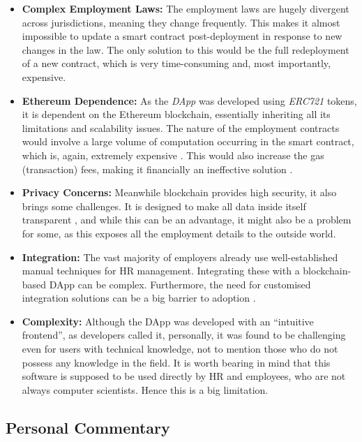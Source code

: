 \begin{itemize}
    \item \textbf{Complex Employment Laws:}
    The employment laws are hugely divergent across jurisdictions, meaning they change frequently. This makes it almost impossible to update a smart contract post-deployment \cite{MagazzeniEtAl2017} in response to new changes in the law. The only solution to this would be the full redeployment of a new contract, which is very time-consuming and, most importantly, expensive.
    \item \textbf{Ethereum Dependence:} 
    As the \textit{DApp} was developed using \textit{ERC721} tokens, it is dependent on the Ethereum blockchain, essentially inheriting all its limitations and scalability issues. The nature of the employment contracts would involve a large volume of computation occurring in the smart contract, which is, again, extremely expensive \cite{Buterin2014}. This would also increase the gas (transaction) fees, making it financially an ineffective solution \cite{Buterin2014}.
    \item \textbf{Privacy Concerns:} Meanwhile blockchain provides high security, it also brings some challenges. It is designed to make all data inside itself transparent \cite{Mik2017}, and while this can be an advantage, it might also be a problem for some, as this exposes all the employment details to the outside world. 
    \item \textbf{Integration:} The vast majority of employers already use well-established manual techniques for HR management. Integrating these with a blockchain-based DApp can be complex. Furthermore, the need for customised integration solutions can be a big barrier to adoption \cite{AllenEtAl2022}.
    \item \textbf{Complexity:} Although the DApp was developed with an ``intuitive frontend'', as developers called it, personally, it was found to be challenging even for users with technical knowledge, not to mention those who do not possess any knowledge in the field. It is worth bearing in mind that this software is supposed to be used directly by HR and employees, who are not always computer scientists. Hence this is a big limitation. 
\end{itemize}

\subsection{Personal Commentary}

